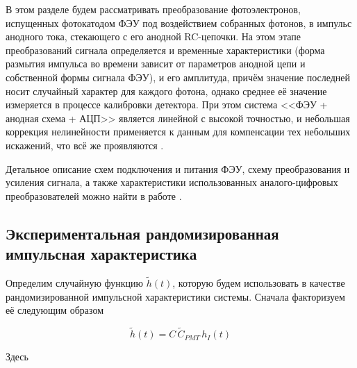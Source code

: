 В этом разделе будем рассматривать преобразование фотоэлектронов, испущенных фотокатодом ФЭУ под воздействием собранных фотонов, в импульс анодного тока, стекающего с его анодной RC-цепочки. На этом этапе преобразований сигнала определяется и временные характеристики (форма размытия импульса во времени зависит от параметров анодной цепи и собственной формы сигнала ФЭУ), и его амплитуда, причём значение последней носит случайный характер для каждого фотона, однако среднее её значение измеряется в процессе калибровки детектора. При этом система <<ФЭУ + анодная схема + АЦП>> является линейной с высокой точностью, и небольшая коррекция нелинейности применяется к данным для компенсации тех небольших искажений, что всё же проявляются \cite{Sphere2015}.

Детальное описание схем подключения и питания ФЭУ, схему преобразования и усиления сигнала, а также характеристики использованных аналого-цифровых преобразователей можно найти в работе \cite{SphereDetector2020}.

\subsection{Экспериментальная рандомизированная импульсная характеристика}

\label{sec:experimental-rir}

Определим случайную функцию $\tilde{h}(t)$, которую будем использовать в качестве рандомизированной импульсной характеристики системы. Сначала факторизуем её следующим образом

\begin{equation}
	\label{eq:experimental-rir}
	\tilde{h}(t) = C \, \tilde{C}_{PMT} \, h_I(t)
\end{equation}

Здесь

